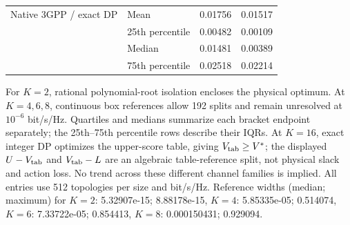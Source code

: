 \documentclass[10pt,letterpaper]{article}
\begin{document}
\begin{table}[p]
\begin{minipage}{\linewidth}
\begin{tabular}{llrr}
Native 3GPP / exact DP & Mean & 0.01756 & 0.01517\\
 & 25th percentile & 0.00482 & 0.00109\\
 & Median & 0.01481 & 0.00389\\
 & 75th percentile & 0.02518 & 0.02214\\
\bottomrule\end{tabular}\par\smallskip
For $K=2$, rational polynomial-root isolation encloses the physical optimum. At $K=4,6,8$, continuous box references allow 192 splits and remain unresolved at $10^{-6}$ bit/s/Hz. Quartiles and medians summarize each bracket endpoint separately; the 25th--75th percentile rows describe their IQRs. At $K=16$, exact integer DP optimizes the upper-score table, giving $V_{\rm tab}\geq V^*$; the displayed $U-V_{\rm tab}$ and $V_{\rm tab}-L$ are an algebraic table-reference split, not physical slack and action loss. No trend across these different channel families is implied. All entries use 512 topologies per size and bit/s/Hz. Reference widths (median; maximum) for $K=2$: 5.32907e-15; 8.88178e-15, $K=4$: 5.85335e-05; 0.514074, $K=6$: 7.33722e-05; 0.854413, $K=8$: 0.000150431; 0.929094.

\end{minipage}
\end{table}
\end{document}
